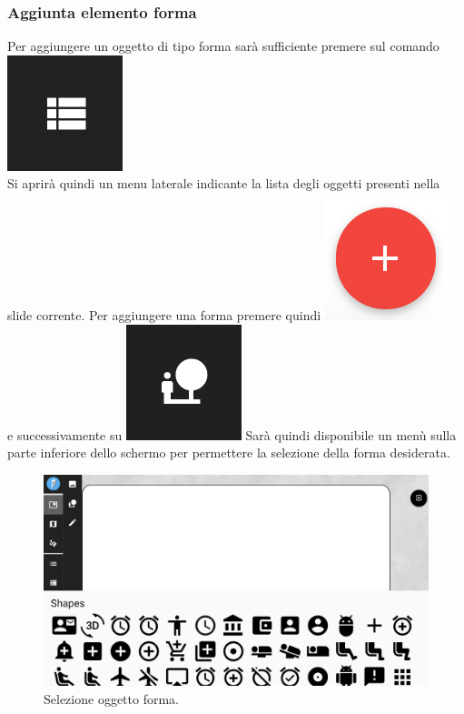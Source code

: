 \newpage
\subsubsection{Aggiunta elemento forma}


Per aggiungere un oggetto di tipo forma sarà sufficiente premere sul comando \includegraphics[scale=0.4]{img/slides_object.png}\\
Si aprirà quindi un menu laterale indicante la lista degli oggetti presenti nella slide corrente. Per aggiungere una forma premere quindi \includegraphics[scale=0.4]{img/add.png}\\ e successivamente su \includegraphics[scale=0.4]{img/add_shape.png}
Sarà quindi disponibile un menù sulla parte inferiore dello schermo per permettere la selezione della forma desiderata.\\
\begin{figure}[H]
\begin{center}
\includegraphics[scale=0.35]{img/sel_shape.png}
\caption{Selezione oggetto forma.}
\end{center}
\end{figure}

